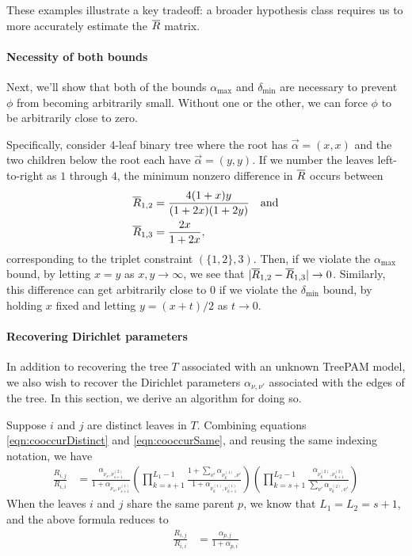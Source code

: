 \documentclass{article}
\theoremstyle{definition}
\newcommand{\deltaMin}{\delta_{\text{min}}}
\newcommand{\alphaMax}{\alpha_{\text{max}}}
\begin{document}
These examples illustrate a key tradeoff: a broader hypothesis class requires us to more accurately estimate the $\overline{R}$ matrix.


\paragraph{Necessity of both bounds}
Next, we'll show that both of the bounds $\alphaMax$ and $\deltaMin$ are necessary to prevent $\phi$ from becoming arbitrarily small.
Without one or the other, we can force $\phi$ to be arbitrarily close to zero.

Specifically, consider 4-leaf binary tree where the root has $\vec\alpha = (x,x)$ and the two children below the root each have $\vec\alpha = (y,y)$.
If we number the leaves left-to-right as $1$ through $4$, the minimum nonzero difference in $\overline{R}$ occurs between
\begin{align*}
\overline{R}_{1,2} &= \frac{4(1+x)y}{(1+2x)(1+2y)} \quad \text{and} \\
\overline{R}_{1,3} &= \frac{2x}{1+2x},
\end{align*}
corresponding to the triplet constraint $(\{1,2\},3)$.
Then, if we violate the $\alphaMax$ bound, by letting $x = y$ as $x,y \to \infty$, we see that $|\overline{R}_{1,2} - \overline{R}_{1,3}| \to 0$.
Similarly, this difference can get arbitrarily close to $0$ if we violate the $\deltaMin$ bound, by holding $x$ fixed and letting $y = (x+t) / 2$ as $t \to 0$.


\paragraph{Recovering Dirichlet parameters}
In addition to recovering the tree $T$ associated with an unknown TreePAM model, we also wish to recover the Dirichlet parameters $\alpha_{\nu,\nu'}$ associated with the edges of the tree.
In this section, we derive an algorithm for doing so.

Suppose $i$ and $j$ are distinct leaves in $T$.
Combining equations \eqref{eqn:cooccurDistinct} and \eqref{eqn:cooccurSame}, and reusing the same indexing notation, we have
\begin{align*}
\frac{R_{i,j}}{R_{i,i}}
&=
\frac
  { \alpha_{ \nu_s, \nu_{s+1}^{(2)} } }
  { 1 + \alpha_{ \nu_s, \nu_{s+1}^{(1)} } }
\left(
  \prod_{k=s+1}^{L_1-1}
    \frac
      { 1 + \sum_{\nu'} \alpha_{ \nu_k^{(1)}, \nu' } }
      { 1 + \alpha_{ \nu_k^{(1)}, \nu_{k+1}^{(1)} } }
\right)
\left(
  \prod_{k=s+1}^{L_2-1}
    \frac
      { \alpha_{ \nu_k^{(2)}, \nu_{k+1}^{(2)} } }
      { \sum_{\nu'} \alpha_{ \nu_k^{(2)}, \nu' } }
\right)
\end{align*}
When the leaves $i$ and $j$ share the same parent $p$, we know that $L_1 = L_2 = s+1$, and the above formula reduces to
\begin{align*}
\frac{R_{i,j}}{R_{i,i}}
&=
\frac
  { \alpha_{ p, j } }
  { 1 + \alpha_{ p, i } }
\end{align*}
\end{document}
